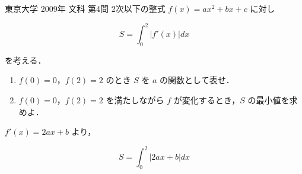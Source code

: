 \documentclass[a4paper]{ltjsarticle}
\begin{document}

\begin{itembox}[l]{東京大学 2009年 文科 第4問}
    2次以下の整式 $f(x)=ax^2+bx+c$ に対し

    \begin{equation*}
        S=\int_{0}^{2}|f'(x)|dx
    \end{equation*}

    を考える．

    \begin{enumerate}[label=(\arabic*)]
        \item $f(0)=0$，$f(2)=2$ のとき $S$ を $a$ の関数として表せ．

        \item $f(0)=0$，$f(2)=2$ を満たしながら $f$ が変化するとき，$S$ の最小値を求めよ．
    \end{enumerate}
\end{itembox}

$f'(x)=2ax+b$ より，

\begin{equation*}
    S=\int_{0}^{2}|2ax+b|dx
\end{equation*}
\end{document}
